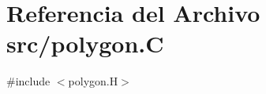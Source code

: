 \hypertarget{polygon_8_c}{}\section{Referencia del Archivo src/polygon.C}
\label{polygon_8_c}
{\ttfamily \#include $<$polygon.\+H$>$}\newline

